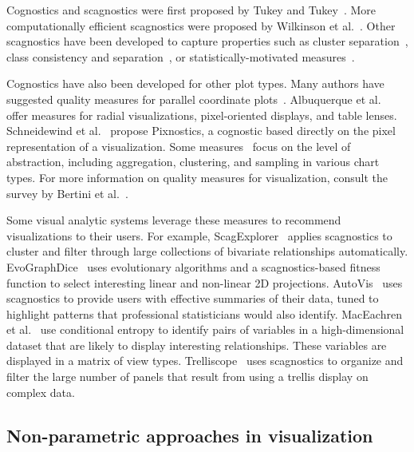 Cognostics and scagnostics were first proposed by Tukey and Tukey~\cite{Tukey1982, Tukey1985}. More computationally efficient scagnostics were proposed by Wilkinson et al.~\cite{Wilkinson2005, Wilkinson2008}. Other scagnostics have been developed to capture properties such as cluster separation~\cite{Sedlmair2012, Tatu2009}, class consistency and separation~\cite{Sips2009, Schafer2013}, or statistically-motivated measures~\cite{Kandel2012, Seo2005, Piringer2008}.

Cognostics have also been developed for other plot types. Many authors have suggested quality measures for parallel coordinate plots~\cite{Ankerst1998, Dasgupta2010, Johansson2009, Yang2003}. Albuquerque et al.~\cite{Albuquerque2010} offer  measures for radial visualizations, pixel-oriented displays, and table lenses. Schneidewind et al.~\cite{Schneidewind2006} propose Pixnostics, a cognostic based directly on the pixel representation of a visualization. Some measures~\cite{Bertini2006, Cui2006, Yang2003} focus on the level of abstraction, including aggregation, clustering, and sampling in various chart types. For more information on quality measures for visualization, consult the survey by Bertini et al.~\cite{Bertini2011}. 

Some visual analytic systems leverage these measures to recommend visualizations to their users. For example, ScagExplorer~\cite{Dang2014} applies scagnostics to cluster and filter through large collections of bivariate relationships automatically.
EvoGraphDice~\cite{Boukhelifa2013} uses evolutionary algorithms and a scagnostics-based fitness function to select interesting linear and non-linear 2D projections.
AutoVis~\cite{Wills2010} uses scagnostics to provide users with effective summaries of their data, tuned to highlight patterns that professional statisticians would also identify.
MacEachren et al.~\cite{Maceachren2003} use conditional entropy to identify pairs of variables in a high-dimensional dataset that are likely to display interesting relationships. These variables are displayed in a matrix of view types. Trelliscope~\cite{Hafen2013} uses scagnostics to organize and filter the large number of panels that result from using a trellis display on complex data.



\subsection{Non-parametric approaches in visualization}

